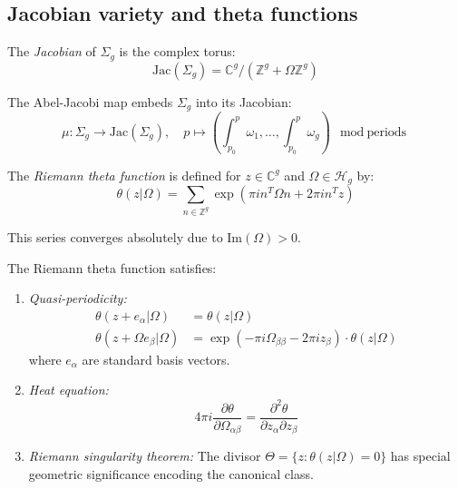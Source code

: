 \subsection{Jacobian variety and theta functions}

\begin{definition}
\label{def:jacobian-variety}
The \emph{Jacobian} of $\Sigma_g$ is the complex torus:
\begin{equation}
\text{Jac}(\Sigma_g) = \mathbb{C}^g / (\mathbb{Z}^g + \Omega \mathbb{Z}^g)
\end{equation}

The Abel-Jacobi map embeds $\Sigma_g$ into its Jacobian:
\begin{equation}
\mu: \Sigma_g \to \text{Jac}(\Sigma_g), \quad p \mapsto \left(\int_{p_0}^p \omega_1, \ldots, \int_{p_0}^p \omega_g\right) \mod \text{periods}
\end{equation}
\end{definition}

\begin{definition}
\label{def:riemann-theta}
The \emph{Riemann theta function} is defined for $z \in \mathbb{C}^g$ and $\Omega \in \mathcal{H}_g$ by:
\begin{equation}
\theta(z|\Omega) = \sum_{n \in \mathbb{Z}^g} \exp\left(\pi i n^T \Omega n + 2\pi i n^T z\right)
\end{equation}

This series converges absolutely due to Im$(\Omega) > 0$.
\end{definition}

\begin{theorem}
\label{thm:theta-properties}
The Riemann theta function satisfies:
\begin{enumerate}
\item \emph{Quasi-periodicity:}
\begin{align}
\theta(z + e_\alpha|\Omega) &= \theta(z|\Omega)\\
\theta(z + \Omega e_\beta|\Omega) &= \exp(-\pi i \Omega_{\beta\beta} - 2\pi i z_\beta) \cdot \theta(z|\Omega)
\end{align}
where $e_\alpha$ are standard basis vectors.

\item \emph{Heat equation:}
\begin{equation}
4\pi i \frac{\partial \theta}{\partial \Omega_{\alpha\beta}} = \frac{\partial^2 \theta}{\partial z_\alpha \partial z_\beta}
\end{equation}

\item \emph{Riemann singularity theorem:} The divisor $\Theta = \{z : \theta(z|\Omega) = 0\}$ has special geometric significance encoding the canonical class.
\end{enumerate}
\end{theorem}

